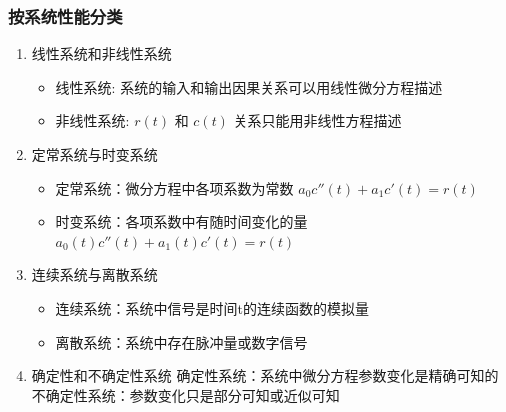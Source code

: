 \documentclass{article}
\begin{document}
\begin{frame}
\frametitle{按系统性能分类}
\label{sec-3-1-6}

\begin{enumerate}
\item <2->线性系统和非线性系统
\begin{itemize}
\item 线性系统: 系统的输入和输出因果关系可以用线性微分方程描述
\item 非线性系统: $r(t)$ 和 $c(t)$ 关系只能用非线性方程描述
\end{itemize}
\item <3->定常系统与时变系统
\begin{itemize}
\item 定常系统：微分方程中各项系数为常数 $a_0c''(t)+a_1c'(t)=r(t)$
\item 时变系统：各项系数中有随时间变化的量 $a_0(t)c''(t)+a_1(t)c'(t)=r(t)$
\end{itemize}
\item <4->连续系统与离散系统
\begin{itemize}
\item 连续系统：系统中信号是时间t的连续函数的模拟量
\item 离散系统：系统中存在脉冲量或数字信号
\end{itemize}
\item <5->确定性和不确定性系统
    确定性系统：系统中微分方程参数变化是精确可知的
    不确定性系统：参数变化只是部分可知或近似可知
\end{enumerate}
\end{frame}
\end{document}
